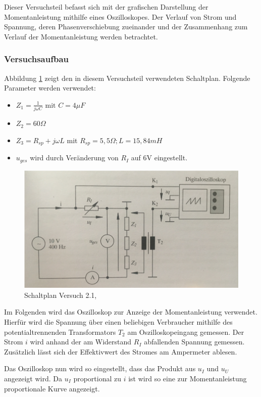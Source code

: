 \label{sec:Versuch2.2.1}
Dieser Versuchsteil befasst sich mit der grafischen Darstellung der Momentanleistung mithilfe eines Oszilloskopes. Der Verlauf von Strom und Spannung, deren Phasenverschiebung zueinander und der Zusammenhang zum Verlauf der Momentanleistung werden betrachtet.


\subsubsection{Versuchsaufbau}
\label{sec:Aufbau2.2.1}

Abbildung \ref{fig:Plan2-1} zeigt den in diesem Versuchsteil verwendeten Schaltplan. Folgende Parameter werden verwendet:
\begin{itemize}
\item $Z_1 = \frac{1}{j\omega C} \mbox{ mit } C=4\mu F$
\item $Z_2 = 60\Omega$
\item $Z_3 = R_{sp} + j\omega L$ mit $R_{sp} = 5,5\Omega; L=15,84mH$
\item $u_{ges}$ wird durch Veränderung von $R_I$ auf 6V eingestellt.
\end{itemize}

\begin{figure}[h]
\centering
\includegraphics[width=0.7\linewidth]{Images/Aufbau2-1.png}
\caption{Schaltplan Versuch 2.1, \cite[47]{GEMLBuch}}
\label{fig:Plan2-1}
\end{figure}

Im Folgenden wird das Oszilloskop zur Anzeige der Momentanleistung verwendet. Hierfür wird die Spannung über einen beliebigen Verbraucher mithilfe des potentialtrennenden Transformators $T_2$ am Oszilloskopeingang gemessen. Der Strom $i$ wird anhand der am Widerstand $R_I$ abfallenden Spannung gemessen. Zusätzlich lässt sich der Effektivwert des Stromes am Ampermeter ablesen.

Das Oszilloskop nun wird so eingestellt, dass das Produkt aus $u_I$ und $u_U$ angezeigt wird. Da $u_I$ proportional zu $i$ ist wird so eine zur Momentanleistung proportionale Kurve angezeigt.

